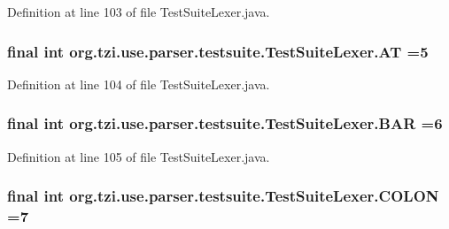 Definition at line 103 of file Test\-Suite\-Lexer.\-java.

\hypertarget{classorg_1_1tzi_1_1use_1_1parser_1_1testsuite_1_1_test_suite_lexer_a887d857a224ec8dbd73ae589d35db57c}{
\subsubsection[{A\-T}]{\setlength{\rightskip}{0pt plus 5cm}final int org.\-tzi.\-use.\-parser.\-testsuite.\-Test\-Suite\-Lexer.\-A\-T =5\hspace{0.3cm}{\ttfamily [static]}}}\label{classorg_1_1tzi_1_1use_1_1parser_1_1testsuite_1_1_test_suite_lexer_a887d857a224ec8dbd73ae589d35db57c}


Definition at line 104 of file Test\-Suite\-Lexer.\-java.

\hypertarget{classorg_1_1tzi_1_1use_1_1parser_1_1testsuite_1_1_test_suite_lexer_aa734d2c2b8a55cac6e4047e01eeef6e8}{
\subsubsection[{B\-A\-R}]{\setlength{\rightskip}{0pt plus 5cm}final int org.\-tzi.\-use.\-parser.\-testsuite.\-Test\-Suite\-Lexer.\-B\-A\-R =6\hspace{0.3cm}{\ttfamily [static]}}}\label{classorg_1_1tzi_1_1use_1_1parser_1_1testsuite_1_1_test_suite_lexer_aa734d2c2b8a55cac6e4047e01eeef6e8}


Definition at line 105 of file Test\-Suite\-Lexer.\-java.

\hypertarget{classorg_1_1tzi_1_1use_1_1parser_1_1testsuite_1_1_test_suite_lexer_a44c6c69fbbdeb5dd94b055aeea061204}{
\subsubsection[{C\-O\-L\-O\-N}]{\setlength{\rightskip}{0pt plus 5cm}final int org.\-tzi.\-use.\-parser.\-testsuite.\-Test\-Suite\-Lexer.\-C\-O\-L\-O\-N =7\hspace{0.3cm}{\ttfamily [static]}}}\label{classorg_1_1tzi_1_1use_1_1parser_1_1testsuite_1_1_test_suite_lexer_a44c6c69fbbdeb5dd94b055aeea061204}


